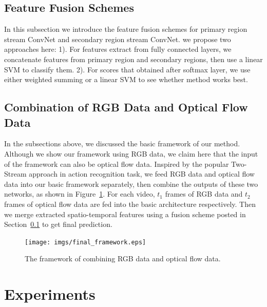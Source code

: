 \documentclass[10pt,twocolumn,letterpaper]{article}
\begin{document}
\subsection{Feature Fusion Schemes}\label{sec:fusion}
In this subsection we introduce the feature fusion schemes for primary region stream ConvNet and secondary region stream ConvNet. we propose two approaches here: 1). For features extract from fully connected layers, we concatenate features from primary region and secondary regions, then use a  linear SVM to classify them. 2). For scores that obtained after softmax layer, we use either weighted summing or a linear SVM to see whether method works best.
\subsection{Combination of RGB Data and Optical Flow Data}
In the subsections above, we discussed the basic framework of our method. Although we show our framework using RGB data, we claim here that the input of the framework can also be optical flow data. Inspired by the popular Two-Stream approach in action recognition task, we feed RGB data and optical flow data into our basic framework separately, then combine the outputs of these two networks, as shown in Figure~\ref{final_framework}. For each video, $t_{1}$ frames of RGB data and $t_{2}$ frames of optical flow data are fed into the basic architecture respectively.  Then we merge extracted spatio-temporal features using a fusion scheme posted in Section~\ref{sec:fusion} to get final prediction.
\begin{figure}[!htbp]
	\begin{center}
		\texttt{[image: imgs/final\_framework.eps]}
		\caption{The framework of combining RGB data and optical flow data.}
		\label{final_framework}
	\end{center}
\end{figure}
\section{Experiments}  \label{sec:experiments}
%
\end{document}
